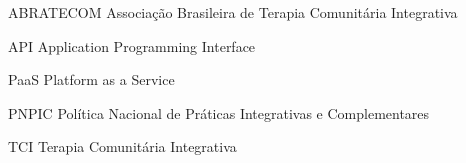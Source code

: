 \begin{siglas}
  
  \item[ABRATECOM] Associação Brasileira de Terapia Comunitária Integrativa
  \item[API] Application Programming Interface 
  \item[PaaS] Platform as a Service
  \item[PNPIC] Política Nacional de Práticas Integrativas e Complementares
  \item[TCI] Terapia Comunitária Integrativa
\end{siglas}
